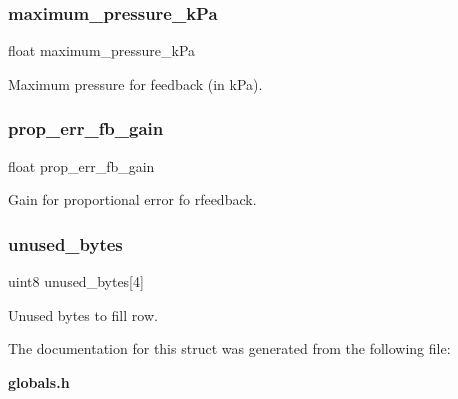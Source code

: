 \subsubsection{maximum\+\_\+pressure\+\_\+k\+Pa}
{\footnotesize\ttfamily float maximum\+\_\+pressure\+\_\+k\+Pa}

Maximum pressure for feedback (in k\+Pa). \mbox{\label{structst___f_b__spec_af4dcbeffaf7f4bc2870dc1f093c0ce1b}} 
\subsubsection{prop\+\_\+err\+\_\+fb\+\_\+gain}
{\footnotesize\ttfamily float prop\+\_\+err\+\_\+fb\+\_\+gain}

Gain for proportional error fo rfeedback. \mbox{\label{structst___f_b__spec_ab3f5ab336def23b2f3b2741d8ec9d9e6}} 
\subsubsection{unused\+\_\+bytes}
{\footnotesize\ttfamily uint8 unused\+\_\+bytes[4]}

Unused bytes to fill row. 

The documentation for this struct was generated from the following file\+:\begin{DoxyCompactItemize}
\item 
\textbf{ globals.\+h}\end{DoxyCompactItemize}
